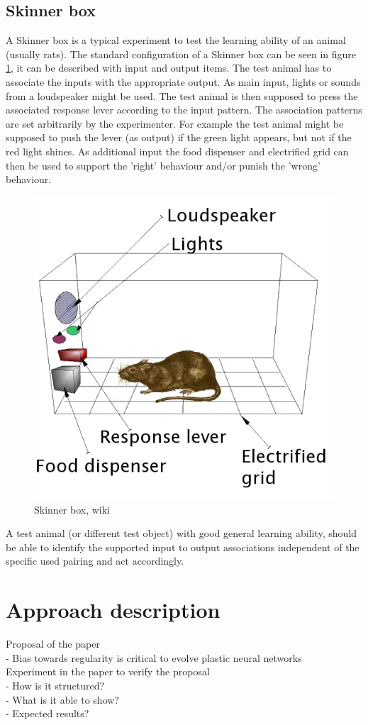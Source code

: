 \documentclass[12pt,twoside]{article}
\theoremstyle{plain}
\theoremstyle{definition}
\theoremstyle{remark}
\begin{document}
\subsection{Skinner box}
A Skinner box is a typical experiment to test the learning ability of an animal (usually rats).
The standard configuration of a Skinner box can be seen in figure \ref{fig:skinner}, it can be described with input and output items.
The test animal has to associate the inputs with the	appropriate output.
As main input, lights or sounds from a loudspeaker might be used. The test animal is then supposed to press the associated response lever according to the input pattern.
The association patterns are set arbitrarily by the experimenter. For example the test animal might be supposed to push the lever (as output) if the green light appears, but not if the red light shines.
As additional input the food dispenser and electrified grid can then be used to support the 'right' behaviour and/or punish the 'wrong' behaviour.

\begin{figure}[h]
	\begin{center}
		\includegraphics[width=.43\textwidth]{Skinner_box_scheme_01.png}
	\end{center}
	\caption{Skinner box, wiki}
	\label{fig:skinner}
\end{figure}

A test animal (or different test object) with good general learning ability, should be able to identify the supported input to output associations independent of the specific used pairing and act accordingly.

\section{Approach description}
\label{sec:model}
Proposal of the paper\\
- Bias towards regularity is critical to evolve plastic neural networks\\
Experiment in the paper to verify the proposal\\
- How is it structured?\\
- What is it able to show?\\
- Expected results?\\
\end{document}
